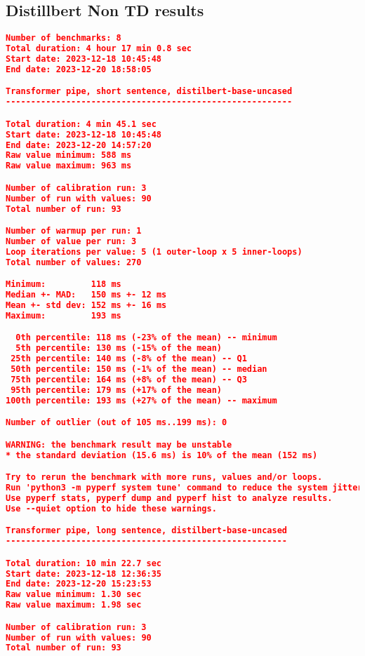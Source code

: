 \subsection{Distillbert Non TD results}
\label{app:bert}
\begin{lstlisting}[language=json]
    Number of benchmarks: 8
Total duration: 4 hour 17 min 0.8 sec
Start date: 2023-12-18 10:45:48
End date: 2023-12-20 18:58:05

Transformer pipe, short sentence, distilbert-base-uncased
---------------------------------------------------------

Total duration: 4 min 45.1 sec
Start date: 2023-12-18 10:45:48
End date: 2023-12-20 14:57:20
Raw value minimum: 588 ms
Raw value maximum: 963 ms

Number of calibration run: 3
Number of run with values: 90
Total number of run: 93

Number of warmup per run: 1
Number of value per run: 3
Loop iterations per value: 5 (1 outer-loop x 5 inner-loops)
Total number of values: 270

Minimum:         118 ms
Median +- MAD:   150 ms +- 12 ms
Mean +- std dev: 152 ms +- 16 ms
Maximum:         193 ms

  0th percentile: 118 ms (-23% of the mean) -- minimum
  5th percentile: 130 ms (-15% of the mean)
 25th percentile: 140 ms (-8% of the mean) -- Q1
 50th percentile: 150 ms (-1% of the mean) -- median
 75th percentile: 164 ms (+8% of the mean) -- Q3
 95th percentile: 179 ms (+17% of the mean)
100th percentile: 193 ms (+27% of the mean) -- maximum

Number of outlier (out of 105 ms..199 ms): 0

WARNING: the benchmark result may be unstable
* the standard deviation (15.6 ms) is 10% of the mean (152 ms)

Try to rerun the benchmark with more runs, values and/or loops.
Run 'python3 -m pyperf system tune' command to reduce the system jitter.
Use pyperf stats, pyperf dump and pyperf hist to analyze results.
Use --quiet option to hide these warnings.

Transformer pipe, long sentence, distilbert-base-uncased
--------------------------------------------------------

Total duration: 10 min 22.7 sec
Start date: 2023-12-18 12:36:35
End date: 2023-12-20 15:23:53
Raw value minimum: 1.30 sec
Raw value maximum: 1.98 sec

Number of calibration run: 3
Number of run with values: 90
Total number of run: 93


\end{lstlisting}
